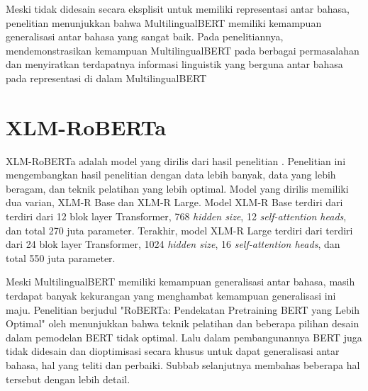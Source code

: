     Meski tidak didesain secara eksplisit untuk memiliki representasi antar bahasa, penelitian \parencite{Pires_Schlinger_Garrette_2019} menunjukkan bahwa MultilingualBERT memiliki kemampuan generalisasi antar bahasa yang sangat baik. Pada penelitiannya, \parencite{Pires_Schlinger_Garrette_2019} mendemonstrasikan kemampuan MultilingualBERT pada berbagai permasalahan dan menyiratkan terdapatnya informasi linguistik yang berguna antar bahasa  pada representasi di dalam MultilingualBERT

\section{XLM-RoBERTa}
    XLM-RoBERTa adalah model yang dirilis dari hasil penelitian \parencite{Conneau_XLMR}. Penelitian ini mengembangkan hasil penelitian \parencite{LampleConneau2019} dengan data lebih banyak, data yang lebih beragam, dan teknik pelatihan yang lebih optimal. Model yang dirilis memiliki dua varian, XLM-R Base dan XLM-R Large. Model XLM-R Base terdiri dari terdiri dari 12 blok layer Transformer, 768 \textit{hidden size}, 12 \textit{self-attention heads}, dan total 270 juta parameter. Terakhir, model XLM-R Large terdiri dari terdiri dari 24 blok layer Transformer, 1024 \textit{hidden size}, 16 \textit{self-attention heads}, dan total 550 juta parameter. 

    Meski MultilingualBERT memiliki kemampuan generalisasi antar bahasa, masih terdapat banyak kekurangan yang menghambat kemampuan generalisasi ini maju.
    Penelitian berjudul "RoBERTa: Pendekatan Pretraining BERT yang Lebih Optimal" oleh \parencite{Liu_Ott_Goyal_Du_Joshi_Chen_Levy_Lewis_Zettlemoyer_Stoyanov_2019} menunjukkan bahwa teknik pelatihan dan beberapa pilihan desain dalam pemodelan BERT tidak optimal. Lalu dalam pembangunannya BERT juga tidak didesain dan dioptimisasi secara khusus untuk dapat generalisasi antar bahasa, hal yang \parencite{Conneau_XLMR} teliti dan perbaiki. Subbab selanjutnya membahas beberapa hal tersebut dengan lebih detail.



